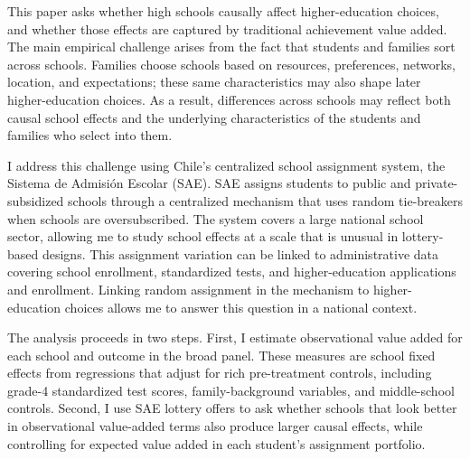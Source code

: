 \documentclass[a4paper, article, english, oneside, unknownkeysallowed, 12pt]{memoir}
\begin{document}
This paper asks whether high schools causally affect higher-education choices, and whether those effects are captured by traditional achievement value added.
The main empirical challenge arises from the fact that students and families sort across schools.
Families choose schools based on resources, preferences, networks, location, and expectations; these same characteristics may also shape later higher-education choices.
As a result, differences across schools may reflect both causal school effects and the underlying characteristics of the students and families who select into them.

I address this challenge using Chile's centralized school assignment system, the Sistema de Admisi\'on Escolar (SAE).
SAE assigns students to public and private-subsidized schools through a centralized mechanism that uses random tie-breakers when schools are oversubscribed.
The system covers a large national school sector, allowing me to study school effects at a scale that is unusual in lottery-based designs.
This assignment variation can be linked to administrative data covering school enrollment, standardized tests, and higher-education applications and enrollment.
Linking random assignment in the mechanism to higher-education choices allows me to answer this question in a national context.


The analysis proceeds in two steps.
First, I estimate observational value added for each school and outcome in the broad panel.
These measures are school fixed effects from regressions that adjust for rich pre-treatment controls, including grade-4 standardized test scores, family-background variables, and middle-school controls.
Second, I use SAE lottery offers to ask whether schools that look better in observational value-added terms also produce larger causal effects, while controlling for expected value added in each student's assignment portfolio.
\end{document}
